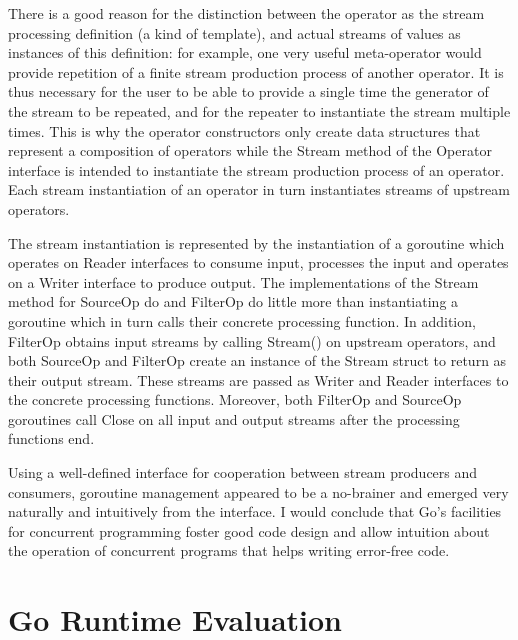 \documentclass {article}
\begin{document}
There is a good reason for the distinction between the operator as the stream processing definition (a kind of template), and actual streams of values as instances of this definition: for example, one very useful meta-operator would provide repetition of a finite stream production process of another operator. It is thus necessary for the user to be able to provide a single time the generator of the stream to be repeated, and for the repeater to instantiate the stream multiple times. This is why the operator constructors only create data structures that represent a composition of operators while the Stream method of the Operator interface is intended to instantiate the stream production process of an operator. Each stream instantiation of an operator in turn instantiates streams of upstream operators.

The stream instantiation is represented by the instantiation of a goroutine which operates on Reader interfaces to consume input, processes the input and operates on a Writer interface to produce output. The implementations of the Stream method for SourceOp do and FilterOp do little more than instantiating a goroutine which in turn calls their concrete processing function. In addition, FilterOp obtains input streams by calling Stream() on upstream operators, and both SourceOp and FilterOp create an instance of the Stream struct to return as their output stream. These streams are passed as Writer and Reader interfaces to the concrete processing functions. Moreover, both FilterOp and SourceOp goroutines call Close on all input and output streams after the processing functions end.

Using a well-defined interface for cooperation between stream producers and consumers, goroutine management appeared to be a no-brainer and emerged very naturally and intuitively from the interface. I would conclude that Go's facilities for concurrent programming foster good code design and allow intuition about the operation of concurrent programs that helps writing error-free code.

\section{Go Runtime Evaluation}
\label{sec:runtime}
\end{document}
